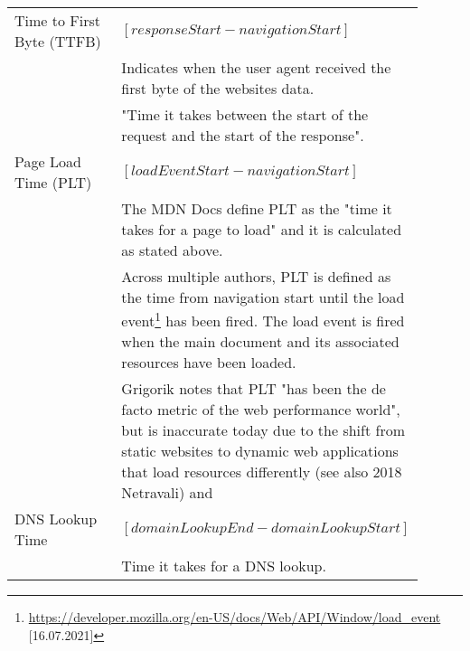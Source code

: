 \begin{center}
	\small
	\begin{longtable}{ | p{0.3\linewidth} | p{0.6\linewidth} | }
	\hline
	Time to First Byte (TTFB)
	& $[responseStart - navigationStart]$ \\
	& Indicates when the user agent received the first byte of the websites data. \\
	& "Time it takes between the start of the request and the start of the response".  \\%
	
	\hline
	Page Load Time (PLT)
	& $[loadEventStart - navigationStart]$ \\
	& The MDN Docs define PLT as the "time it takes for a page to load" and it is calculated as stated above.  \\ %
	& Across multiple authors, PLT is defined as the time from navigation start until the load event\footnote{\url{https://developer.mozilla.org/en-US/docs/Web/API/Window/load_event} [16.07.2021]} has been fired.
	The load event is fired when the main document and its associated resources have been loaded. \\
	& Grigorik notes that PLT "has been the de facto metric of the web performance world", but is inaccurate today due to the shift from static websites to dynamic web applications that load resources differently (see also 2018 Netravali) and \\ %
			
	
	\hline
	DNS Lookup Time
	& $[domainLookupEnd - domainLookupStart]$ \\
	& Time it takes for a DNS lookup.  \\
	

\end{longtable}
\end{center}
